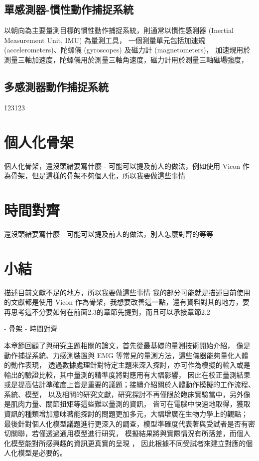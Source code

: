 \subsection{單感測器-慣性動作捕捉系統}
以朝向為主要量測目標的慣性動作捕捉系統，則通常以慣性感測器 (Inertial Measurement Unit, IMU) 為量測工具，
一個測量單元包括加速規 (accelerometers)、陀螺儀 (gyroscopes) 及磁力計 (magnetometers)，
加速規用於測量三軸加速度，陀螺儀用於測量三軸角速度，磁力計用於測量三軸磁場強度，

\subsection{多感測器動作捕捉系統}
123123

\section{個人化骨架}
個人化骨架，還沒頭緒要寫什麼
- 可能可以提及前人的做法，例如使用 Vicon 作為骨架，但是這樣的骨架不夠個人化，所以我要做這些事情

\section{時間對齊}
還沒頭緒要寫什麼
- 可能可以提及前人的做法，別人怎麼對齊的等等

\section{小結}
描述目前文獻不足的地方，所以我要做這些事情
我的部分可能就是描述目前使用的文獻都是使用 Vicon 作為骨架，我想要改善這一點，還有資料對其的地方，要再思考這不分要如何在前面2.3的章節先提到，而且可以承接章節2.2

- 骨架
- 時間對齊

本章節回顧了與研究主題相關的論文，首先從最基礎的量測技術開始介紹，
像是動作捕捉系統、力感測裝置與 EMG 等常見的量測方法，這些儀器能夠量化人體的動作表現，
透過數據處理針對特定主題來深入探討，亦可作為模擬的輸入或是輸出的驗證比較，其中量測的精準度將對應用有大幅影響，
因此在校正量測結果或是提高估計準確度上皆是重要的議題；接續介紹關於人體動作模擬的工作流程、系統、模型，
以及相關的研究文獻，研究探討不再僅限於臨床實驗當中，另外像是肌肉力量、關節扭矩等這些難以量測的資訊，
皆可在電腦中快速地取得，獲取資訊的種類增加意味著能探討的問題更加多元，大幅增廣在生物力學上的觀點；
最後針對個人化模型議題進行更深入的調查，模型準確度代表著與受試者是否有密切關聯，若僅透過通用模型進行研究，
模擬結果將與實際情況有所落差，而個人化模型能對所感興趣的資訊更真實的呈現 \cite{akhundov2022subject}，
因此根據不同受試者來建立對應的個人化模型是必要的。

